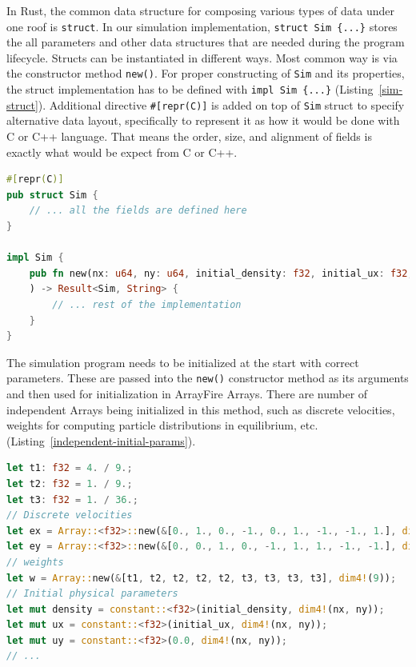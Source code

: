 In Rust, the common data structure for composing various types of data under one roof is \texttt{struct}. In our simulation implementation, \texttt{struct Sim \{...\}} stores the all parameters and other data structures that are needed during the program lifecycle. Structs can be instantiated in different ways. Most common way is via the constructor method \texttt{new()}. For proper constructing of \texttt{Sim} and its properties, the struct implementation has to be defined with \texttt{impl Sim \{...\}} (Listing~\ref{sim-struct}). Additional directive \texttt{\#[repr(C)]} is added on top of \texttt{Sim} struct to specify alternative data layout, specifically to represent it as how it would be done with C or C++ language. That means the order, size, and alignment of fields is exactly what would be expect from C or C++.

\begin{lstlisting}[language=Rust, caption=Implementation of Sim struct with constructor method., label=sim-struct]
#[repr(C)]
pub struct Sim {
	// ... all the fields are defined here
}

impl Sim {
	pub fn new(nx: u64, ny: u64, initial_density: f32, initial_ux: f32, omega: f32, obstacle_x: u64, obstacle_y: u64, obstacle_r: u64
	) -> Result<Sim, String> {
		// ... rest of the implementation
	}
}
\end{lstlisting}

The simulation program needs to be initialized at the start with correct parameters. These are passed into the \texttt{new()} constructor method as its arguments and then used for initialization in ArrayFire Arrays. There are number of independent Arrays being initialized in this method, such as discrete velocities, weights for computing particle distributions in equilibrium, etc. (Listing~\ref{independent-initial-params}).

\begin{lstlisting}[language=Rust, caption=Setting initial parameters that are independent from constructor method's input arguments., label=independent-initial-params]
let t1: f32 = 4. / 9.;
let t2: f32 = 1. / 9.;
let t3: f32 = 1. / 36.;
// Discrete velocities
let ex = Array::<f32>::new(&[0., 1., 0., -1., 0., 1., -1., -1., 1.], dim4!(9));
let ey = Array::<f32>::new(&[0., 0., 1., 0., -1., 1., 1., -1., -1.], dim4!(9));
// weights
let w = Array::new(&[t1, t2, t2, t2, t2, t3, t3, t3, t3], dim4!(9));
// Initial physical parameters
let mut density = constant::<f32>(initial_density, dim4!(nx, ny));
let mut ux = constant::<f32>(initial_ux, dim4!(nx, ny));
let mut uy = constant::<f32>(0.0, dim4!(nx, ny));
// ...
\end{lstlisting}

